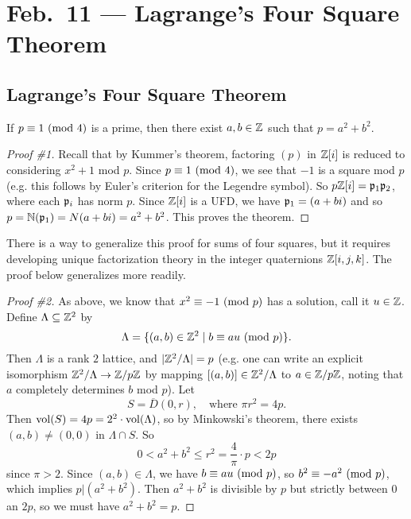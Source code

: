 \chapter{Feb.~11 --- Lagrange's Four Square Theorem}

\section{Lagrange's Four Square Theorem}
\begin{theorem}[Fermat]
  If $p \equiv 1 \ (\mathrm{mod}\ 4)$ is a prime, then
  there exist $a, b \in \mathbb{Z}$ such that $p = a^2 + b^2$.
\end{theorem}

\begin{proof}[Proof \#1]
  Recall that by Kummer's theorem, factoring
  $(p)$ in $\mathbb{Z}[i]$ is reduced to considering
  $x^2 + 1$ mod $p$. Since $p \equiv 1 \ (\mathrm{mod}\ 4)$,
  we see that $-1$ is a square mod $p$ (e.g. this follows
  by Euler's criterion for the Legendre symbol).
  So $p\mathbb{Z}[i] = \mathfrak{p}_1 \mathfrak{p}_2$, where each $\mathfrak{p}_i$ has norm $p$.
  Since $\mathbb{Z}[i]$ is a UFD, we have $\mathfrak{p}_1 = (a + bi)$
  and so $p = \mathbb{N}(\mathfrak{p}_1) = N(a + bi) = a^2 + b^2$.
  This proves the theorem.
\end{proof}

\begin{remark}
  There is a way to generalize this proof for sums of
  four squares, but it requires developing unique factorization
  theory in the integer quaternions $\mathbb{Z}[i, j, k]$.
  The proof below generalizes more readily.
\end{remark}

\begin{proof}[Proof \#2]
  As above, we know that $x^2 \equiv -1 \ (\mathrm{mod}\ p)$
  has a solution, call it $u \in \mathbb{Z}$. Define $\Lambda \subseteq \mathbb{Z}^2$ by
  \[
    \Lambda = \{(a, b) \in \mathbb{Z}^2 \mid b \equiv au \ (\mathrm{mod}\ p)\}.
  \]
  Then $\Lambda$ is a rank $2$ lattice, and
  $|\mathbb{Z}^2 / \Lambda| = p$ (e.g. one can write an explicit
  isomorphism $\mathbb{Z}^2 / \Lambda \to \mathbb{Z} / p\mathbb{Z}$ by mapping
  $[(a, b)] \in \mathbb{Z}^2 / \Lambda$ to $a \in \mathbb{Z} / p\mathbb{Z}$, noting
  that $a$ completely determines $b$ mod $p$). Let
  \[
    S = \overline{D}(0, r), \quad \text{where } \pi r^2 = 4p.
  \]
  Then $\operatorname{vol}(S) = 4p = 2^2 \cdot \operatorname{vol}(\Lambda)$, so
  by Minkowski's theorem, there exists $(a, b) \ne (0, 0)$
  in $\Lambda \cap S$. So
  \[
    0 < a^2 + b^2 \le r^2 = \frac{4}{\pi} \cdot p < 2p
  \]
  since $\pi > 2$. Since $(a, b) \in \Lambda$, we have
  $b \equiv au \ (\mathrm{mod}\ p)$, so $b^2 \equiv -a^2 \ (\mathrm{mod}\ p)$,
  which implies $p | (a^2 + b^2)$. Then
  $a^2 + b^2$ is divisible by $p$ but strictly
  between $0$ an $2p$, so we must have $a^2 + b^2 = p$.
\end{proof}

